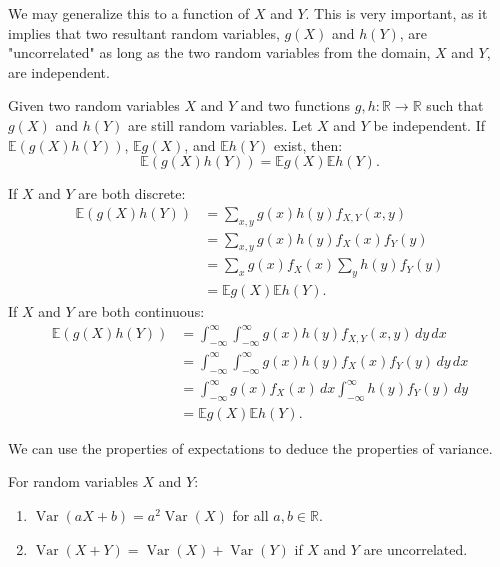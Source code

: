 \documentclass{huhtakm-template-book-v2}
\newcommand{\expect}{\mathbb{E}}
\DeclareMathOperator{\Var}{Var}
\begin{document}
    We may generalize this to a function of $X$ and $Y$. This is very important, as it implies that two resultant random variables, $g(X)$ and $h(Y)$, are "uncorrelated" as long as the two random variables from the domain, $X$ and $Y$, are independent.
    \begin{thm}
        Given two random variables $X$ and $Y$ and two functions $g,h:\mathbb{R} \to \mathbb{R}$ such that $g(X)$ and $h(Y)$ are still random variables. Let $X$ and $Y$ be independent. If $\expect(g(X)h(Y))$, $\expect{g(X)}$, and $\expect{h(Y)}$ exist, then:
        \begin{equation*}
            \expect(g(X)h(Y)) = \expect{g(X)}\expect{h(Y)}.
        \end{equation*}
    \end{thm}
    \begin{proofing}
        If $X$ and $Y$ are both discrete:
        \begin{align*}
            \expect(g(X)h(Y)) &= \sum_{x,y}g(x)h(y)f_{X,Y}(x, y)\\
            &= \sum_{x,y}g(x)h(y)f_{X}(x)f_{Y}(y)\\
            &= \sum_{x}g(x)f_{X}(x)\sum_{y}h(y)f_{Y}(y)\\
            &= \expect{g(X)}\expect{h(Y)}.
        \end{align*}
        If $X$ and $Y$ are both continuous:
        \begin{align*}
            \expect(g(X)h(Y)) &= \int_{-\infty}^{\infty}\int_{-\infty}^{\infty} g(x)h(y)f_{X,Y}(x, y)\,dy\,dx\\
            &= \int_{-\infty}^{\infty}\int_{-\infty}^{\infty} g(x)h(y)f_{X}(x)f_{Y}(y)\,dy\,dx\\
            &= \int_{-\infty}^{\infty} g(x)f_{X}(x)\,dx\int_{-\infty}^{\infty} h(y)f_{Y}(y)\,dy\\
            &= \expect{g(X)}\expect{h(Y)}.
        \end{align*}
    \end{proofing}
    We can use the properties of expectations to deduce the properties of variance.
    \begin{thm}
        For random variables $X$ and $Y$:
        \begin{enumerate}
            \item $\Var(aX+b) = a^{2}\Var(X)$ for all $a,b \in \mathbb{R}$.
            \item $\Var(X+Y) = \Var(X)+\Var(Y)$ if $X$ and $Y$ are uncorrelated.
        \end{enumerate}
    \end{thm}
\end{document}
